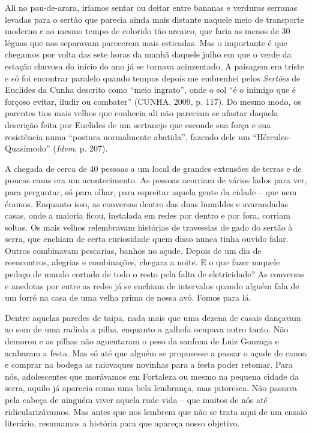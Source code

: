 Ali no pau-de-arara, iríamos sentar ou deitar entre bananas e verduras
serranas levadas para o sertão que parecia ainda mais distante naquele
meio de transporte moderno e ao mesmo tempo de colorido tão arcaico, que
faria as menos de 30 léguas que nos separavam parecerem mais esticadas.
Mas o importante é que chegamos por volta das sete horas da manhã
daquele julho em que o verde da estação chuvosa do início do ano já se
tornava acinzentado. A paisagem era triste e só foi encontrar paralelo
quando tempos depois me embrenhei pelos \emph{Sertões} de Euclides da
Cunha descrito como ``meio ingrato'', onde o sol ``é o inimigo que é
forçoso evitar, iludir ou combater'' (CUNHA, 2009, p. 117). Do mesmo
modo, os parentes tios mais velhos que conhecia ali não pareciam se
afastar daquela descrição feita por Euclides de um sertanejo que esconde
sua força e sua resistência numa ``postura normalmente abatida'',
fazendo dele um ``Hércules-Quasímodo'' (\emph{Idem}, p. 207).

A chegada de cerca de 40 pessoas a um local de grandes extensões de
terras e de poucas casas era um acontecimento. As pessoas acorriam de
vários lados para ver, para perguntar, só para olhar, para espreitar
aquela gente da cidade -- que nem éramos. Enquanto isso, as conversas
dentro das duas humildes e avarandadas casas, onde a maioria ficou,
instalada em redes por dentro e por fora, corriam soltas. Os mais velhos
relembravam histórias de travessias de gado do sertão à serra, que
enchiam de certa curiosidade quem disso nunca tinha ouvido falar. Outros
combinavam pescarias, banhos no açude. Depois de um dia de reencontros,
alegrias e combinações, chegara a noite. E o que fazer naquele pedaço de
mundo cortado de todo o resto pela falta de eletricidade? As conversas e
anedotas por entre as redes já se enchiam de intervalos quando alguém
fala de um forró na casa de uma velha prima de nossa avó. Fomos para lá.

Dentre aquelas paredes de taipa, nada mais que uma dezena de casais
dançavam ao som de uma radiola a pilha, enquanto a galhofa ocupava outro
tanto. Não demorou e as pilhas não aguentaram o peso da sanfona de Luiz
Gonzaga e acabaram a festa. Mas só até que alguém se propusesse a passar
o açude de canoa e comprar na bodega as raiovaques novinhas para a festa
poder retomar. Para nós, adolescentes que morávamos em Fortaleza ou
mesmo na pequena cidade da serra, aquilo já aparecia como uma bela
lembrança, mas pitoresca. Não passava pela cabeça de ninguém viver
aquela rude vida -- que muitos de nós até ridicularizávamos. Mas antes
que nos lembrem que não se trata aqui de um ensaio literário, resumamos
a história para que apareça nosso objetivo.

